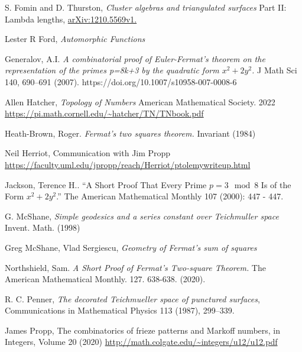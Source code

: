 \documentclass[12pt,a4paper]{amsart}
\begin{document}
S. Fomin and D. Thurston,
\textit{Cluster algebras and triangulated surfaces}
Part II: Lambda lengths, \url{arXiv:1210.5569v1.}

Lester R Ford,
\textit{Automorphic Functions}

Generalov, A.I. 
\textit{A combinatorial proof of Euler-Fermat’s theorem on the representation of the primes p=8k+3 by the quadratic
form $x^2 + 2y^2$. }
J Math Sci 140, 690–691 (2007). https://doi.org/10.1007/s10958-007-0008-6


Allen Hatcher, 
\textit{Topology of Numbers} 
American Mathematical Society.
2022
\url{https://pi.math.cornell.edu/~hatcher/TN/TNbook.pdf}


Heath-Brown, Roger. 
\textit{ Fermat’s two squares theorem.} Invariant (1984) 

Neil Herriot, Communication with Jim Propp
\url{https://faculty.uml.edu/jpropp/reach/Herriot/ptolemywriteup.html}

Jackson, Terence H.. “A Short Proof That Every Prime $p = 3 \mod 8$ Is of the Form $x^2 + 2y^2$.” The American Mathematical Monthly 107 (2000): 447 - 447.




G. McShane,
\textit{Simple geodesics and a series constant over Teichmuller space}
Invent. Math. (1998)

Greg McShane, Vlad Sergiescu,
\textit{Geometry of Fermat's sum of squares}

Northshield, Sam. 
\textit{A Short Proof of Fermat’s Two-square Theorem.} The American Mathematical Monthly. 127. 638-638. (2020). 


R. C. Penner, 
\textit{The decorated Teichmueller space of punctured surfaces}, 
Communications in Mathematical Physics 113 (1987), 299–339.


James Propp,
The combinatorics of frieze patterns and Markoff numbers,
in  Integers, Volume 20 (2020)
\url{http://math.colgate.edu/~integers/u12/u12.pdf}
\end{document}
